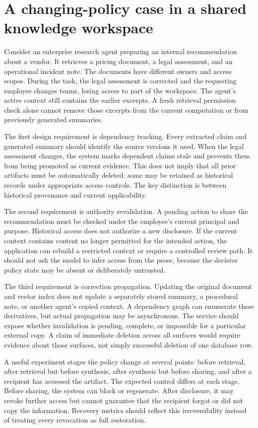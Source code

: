 \section{A changing-policy case in a shared knowledge workspace}\label{sec:C24:policycase}
Consider an enterprise research agent preparing an internal recommendation about a vendor. It retrieves a pricing document, a legal assessment, and an operational incident note. The documents have different owners and access scopes. During the task, the legal assessment is corrected and the requesting employee changes teams, losing access to part of the workspace. The agent's active context still contains the earlier excerpts. A fresh retrieval permission check alone cannot remove those excerpts from the current computation or from previously generated summaries.

The first design requirement is dependency tracking. Every extracted claim and generated summary should identify the source versions it used. When the legal assessment changes, the system marks dependent claims stale and prevents them from being promoted as current evidence. This does not imply that all prior artifacts must be automatically deleted: some may be retained as historical records under appropriate access controls. The key distinction is between historical provenance and current applicability.

The second requirement is authority revalidation. A pending action to share the recommendation must be checked under the employee's current principal and purpose. Historical access does not authorize a new disclosure. If the current context contains content no longer permitted for the intended action, the application can rebuild a restricted context or require a controlled review path. It should not ask the model to infer access from the prose, because the decisive policy state may be absent or deliberately untrusted.

The third requirement is correction propagation. Updating the original document and vector index does not update a separately stored summary, a procedural note, or another agent's copied context. A dependency graph can enumerate these derivatives, but actual propagation may be asynchronous. The service should expose whether invalidation is pending, complete, or impossible for a particular external copy. A claim of immediate deletion across all surfaces would require evidence about those surfaces, not simply successful deletion of one database row.

A useful experiment stages the policy change at several points: before retrieval, after retrieval but before synthesis, after synthesis but before sharing, and after a recipient has accessed the artifact. The expected control differs at each stage. Before sharing, the system can block or regenerate. After disclosure, it may revoke further access but cannot guarantee that the recipient forgot or did not copy the information. Recovery metrics should reflect this irreversibility instead of treating every revocation as full restoration.

